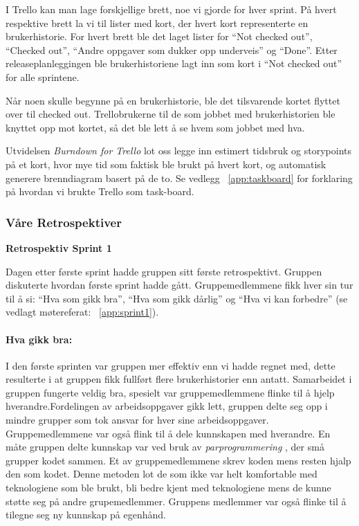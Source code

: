 \documentclass[12pt,a4paper,norsk]{article}
\begin{document}
    I Trello kan man lage forskjellige brett, noe vi gjorde for hver sprint. På hvert respektive brett la vi til lister med kort, der hvert kort representerte en brukerhistorie. For hvert brett ble det laget lister for “Not checked out”, “Checked out”, “Andre oppgaver som dukker opp underveis” og “Done”. Etter releaseplanleggingen ble brukerhistoriene lagt inn som kort i “Not checked out” for alle sprintene.

    Når noen skulle begynne på en brukerhistorie, ble det tilsvarende kortet flyttet over til checked out. Trellobrukerne til de som jobbet med brukerhistorien ble knyttet opp mot kortet, så det ble lett å se hvem som jobbet med hva.

    Utvidelsen \textit{Burndown for Trello} lot oss legge inn estimert tidsbruk og storypoints på et kort, hvor mye tid som faktisk ble brukt på hvert kort, og automatisk generere brenndiagram basert på de to. Se vedlegg ~\ref{app:taskboard} for forklaring på hvordan vi brukte Trello som task-board.
  \subsubsection{Våre Retrospektiver}

\bigskip \noindent \textbf{Retrospektiv Sprint 1}
\par Dagen etter første sprint hadde gruppen sitt første retrospektivt. Gruppen  diskuterte hvordan første sprint hadde gått. Gruppemedlemmene fikk hver sin tur til å si: “Hva som gikk bra”, “Hva som gikk dårlig” og “Hva vi kan forbedre” (se vedlagt møtereferat: ~\cref{app:sprint1}).

\paragraph{Hva gikk bra:}
I den første sprinten var gruppen mer effektiv enn vi hadde regnet med, dette resulterte i at gruppen fikk fullført flere brukerhistorier enn antatt. Samarbeidet i gruppen fungerte veldig bra, spesielt var gruppemedlemmene flinke til å hjelp hverandre.Fordelingen av arbeidsoppgaver gikk lett, gruppen delte seg opp i mindre grupper som tok ansvar for hver sine arbeidsoppgaver. Gruppemedlemmene var også flink til å dele kunnskapen med hverandre. En måte gruppen delte kunnskap var ved bruk av \textit{parprogrammering} \cite[side 17]{dyba}, der små grupper kodet sammen. Et av gruppemedlemmene skrev koden mens resten hjalp den som kodet. Denne metoden lot de som ikke var helt komfortable med teknologiene som ble brukt, bli bedre kjent med teknologiene mens de kunne støtte seg på andre grupemedlemmer. Gruppens medlemmer var også flinke til å tilegne seg ny kunnskap på egenhånd.
\end{document}
